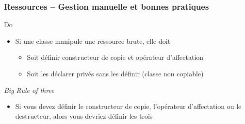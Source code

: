 \documentclass[C++.tex]{subfiles}
\begin{document}
\begin{frame}[fragile]
	\frametitle{Ressources -- Gestion manuelle et bonnes pratiques}
	\begin{exampleblock}{Do}
		\begin{itemize}
			\item Si une classe manipule une ressource brute, elle doit
			\begin{itemize}
				\item Soit définir constructeur de copie et opérateur d'affectation
				\item Soit les déclarer privés sans les définir (classe non copiable)
			\end{itemize}
		\end{itemize}
	\end{exampleblock}

	\begin{exampleblock}{\textit{Big Rule of three}}
		\begin{itemize}
			\item Si vous devez définir le constructeur de copie, l'opérateur d'affectation ou le destructeur, alors vous devriez définir les trois

		\end{itemize}
	\end{exampleblock}
\end{frame}
\end{document}
